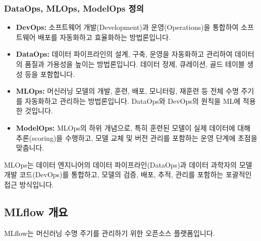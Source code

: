 \documentclass[11pt,a4paper]{article}
\theoremstyle{definition}
\begin{document}
\subsubsection*{DataOps, MLOps, ModelOps 정의}
\begin{itemize}
    \item \textbf{DevOps:} 소프트웨어 개발(Development)과 운영(Operations)을 통합하여 소프트웨어 배포를 자동화하고 효율화하는 방법론입니다.
    \item \textbf{DataOps:} 데이터 파이프라인의 설계, 구축, 운영을 자동화하고 관리하여 데이터의 품질과 가용성을 높이는 방법론입니다. 데이터 정제, 큐레이션, 골드 테이블 생성 등을 포함합니다.
    \item \textbf{MLOps:} 머신러닝 모델의 개발, 훈련, 배포, 모니터링, 재훈련 등 전체 수명 주기를 자동화하고 관리하는 방법론입니다. DataOps와 DevOps의 원칙을 ML에 적용한 것입니다.
    \item \textbf{ModelOps:} MLOps의 하위 개념으로, 특히 훈련된 모델이 실제 데이터에 대해 추론(scoring)을 수행하고, 모델 교체 및 버전 관리를 포함하는 운영 단계에 초점을 맞춥니다.
\end{itemize}
MLOps는 데이터 엔지니어의 데이터 파이프라인(DataOps)과 데이터 과학자의 모델 개발 코드(DevOps)를 통합하고, 모델의 검증, 배포, 추적, 관리를 포함하는 포괄적인 접근 방식입니다.

\subsection*{MLflow 개요}
MLflow는 머신러닝 수명 주기를 관리하기 위한 오픈소스 플랫폼입니다.
\end{document}
